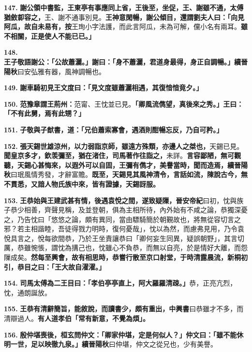 \textbf{147.} \textbf{謝公領中書監，王東亭有事應同上省，王後至，坐促，王、謝雖不通，太傅猶斂厀容之，}{\footnotesize 王、謝不通事別見。}\textbf{王神意閑暢，謝公傾目，還謂劉夫人曰：「向見阿瓜，故自未易有，}{\footnotesize \textbf{按}王珣小字法護，而此言阿瓜，未為可解，儻小名有兩耳。}\textbf{雖不相關，正是使人不能已已。」}

\textbf{148.} \textbf{王子敬語謝公：「公故蕭灑。」謝曰：「身不蕭灑，君道身最得，身正自調暢。」}{\footnotesize \textbf{續晉陽秋}曰安弘雅有器，風神調暢也。}

\textbf{149.} \textbf{謝車騎初見王文度曰：「見文度雖蕭灑相遇，其復愔愔竟夕。」}

\textbf{150.} \textbf{范豫章謂王荊州：}{\footnotesize 范甯、王忱並已見。}\textbf{「卿風流儁望，真後來之秀。」王曰：「不有此舅，焉有此甥？」}

\textbf{151.} \textbf{子敬與子猷書，道：「兄伯蕭索寡會，遇酒則酣暢忘反，乃自可矜。」}

\textbf{152.} \textbf{張天錫世雄涼州，以力弱詣京師，雖遠方殊類，亦邊人之桀也，}{\footnotesize 天錫已見。}\textbf{聞皇京多才，欽羡彌至，猶在渚住，司馬著作往詣之，}{\footnotesize 未詳。}\textbf{言容鄙陋，無可觀聽，天錫心甚悔來，以遐外可以自固，王彌有儁才，美譽當時，聞而造焉，}{\footnotesize \textbf{續晉陽秋}曰珉風情秀發，才辭富贍。}\textbf{既至，天錫見其風神清令，言話如流，陳說古今，無不貫悉，又諳人物氏族中來，皆有證據，天錫訝服。}

\textbf{153.} \textbf{王恭始與王建武甚有情，後遇袁悅之間，遂致疑隟，}{\footnotesize \textbf{晉安帝紀}曰初，忱與族子恭少相善，齊聲見稱，及並登朝，俱為主相所待，內外始有不咸之論，恭獨深憂之，乃告忱曰「悠悠之論，頗有異同，當由驃騎簡於朝覲故也，將無從容切言之邪？若主相諧睦，吾徒得戮力明時，復何憂哉」，忱以為然，而慮弗見用，乃令袁悅具言之，悅每欲間恭，乃於王坐責讓恭曰「卿何妄生同異，疑誤朝野」，其言切厲，恭雖惋悵，謂忱為搆己也，忱雖心不負恭，而無以自亮，於是情好大離，而怨隟成矣。}\textbf{然每至興會，故有相思時，恭嘗行散至京口射堂，于時清露晨流，新桐初引，恭目之曰：「王大故自濯濯。」}

\textbf{154.} \textbf{司馬太傅為二王目曰：「孝伯亭亭直上，阿大羅羅清疎。」}{\footnotesize 恭，正亮亢烈，忱，通朗誕放。}

\textbf{155.} \textbf{王恭有清辭簡旨，能敘說，而讀書少，頗有重出，}{\footnotesize \textbf{中興書}曰恭雖才不多，而清辯過人。}\textbf{有人道孝伯「常有新意，不覺為煩」。}

\textbf{156.} \textbf{殷仲堪喪後，桓玄問仲文：「卿家仲堪，定是何似人？」仲文曰：「雖不能休明一世，足以映徹九泉。」}{\footnotesize \textbf{續晉陽秋}曰仲堪，仲文之從兄也，少有美譽。}
